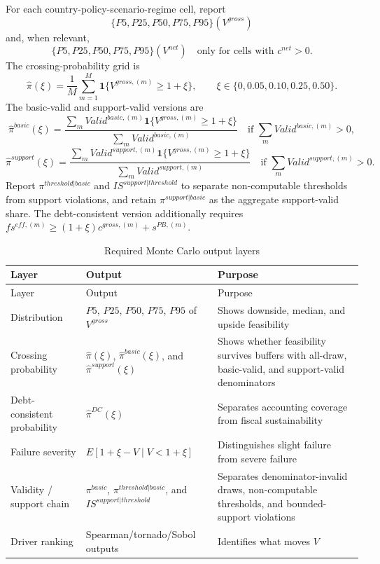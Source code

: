 \documentclass[11pt,a4paper]{article}
\begin{document}
For each country-policy-scenario-regime cell, report
\begin{equation}
    \{P5,P25,P50,P75,P95\}(V^{gross})
\end{equation}
and, when relevant,
\begin{equation}
    \{P5,P25,P50,P75,P95\}(V^{net})\quad\text{only for cells with }c^{net}>0.
\end{equation}
The crossing-probability grid is
\begin{equation}
    \widehat{\pi}(\xi)=\frac{1}{M}\sum_{m=1}^{M}\mathbf{1}\{V^{gross,(m)}\geq1+\xi\},
    \qquad \xi\in\{0,0.05,0.10,0.25,0.50\}.
\end{equation}
The basic-valid and support-valid versions are
\begin{equation}
    \widehat{\pi}^{basic}(\xi)=
    \frac{\sum_m Valid^{basic,(m)}\mathbf{1}\{V^{gross,(m)}\geq1+\xi\}}
    {\sum_m Valid^{basic,(m)}}
    \quad\text{if }\sum_m Valid^{basic,(m)}>0,
\end{equation}
\begin{equation}
    \widehat{\pi}^{support}(\xi)=
    \frac{\sum_m Valid^{support,(m)}\mathbf{1}\{V^{gross,(m)}\geq1+\xi\}}
    {\sum_m Valid^{support,(m)}}
    \quad\text{if }\sum_m Valid^{support,(m)}>0.
\end{equation}
Report $\pi^{threshold|basic}$ and $IS^{support|threshold}$ to separate non-computable thresholds from support violations, and retain $\pi^{support|basic}$ as the aggregate support-valid share. The debt-consistent version additionally requires $fs^{eff,(m)}\geq(1+\xi)c^{gross,(m)}+s^{PB,(m)}$.

\begin{longtable}{p{}p{}p{}}
\caption{Required Monte Carlo output layers}\label{tab:mc_output_layers}\\
\toprule
Layer & Output & Purpose \\
\midrule
\endfirsthead
\toprule
Layer & Output & Purpose \\
\midrule
\endhead
Distribution & $P5$, $P25$, $P50$, $P75$, $P95$ of $V^{gross}$ & Shows downside, median, and upside feasibility \\
Crossing probability & $\widehat{\pi}(\xi)$, $\widehat{\pi}^{basic}(\xi)$, and $\widehat{\pi}^{support}(\xi)$ & Shows whether feasibility survives buffers with all-draw, basic-valid, and support-valid denominators \\
Debt-consistent probability & $\widehat{\pi}^{DC}(\xi)$ & Separates accounting coverage from fiscal sustainability \\
Failure severity & $E[1+\xi-V\mid V<1+\xi]$ & Distinguishes slight failure from severe failure \\
Validity / support chain & $\pi^{basic}$, $\pi^{threshold|basic}$, and $IS^{support|threshold}$ & Separates denominator-invalid draws, non-computable thresholds, and bounded-support violations \\
Driver ranking & Spearman/tornado/Sobol outputs & Identifies what moves $V$ \\
\bottomrule
\end{longtable}
\end{document}
